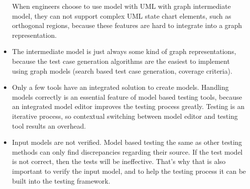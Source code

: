 \begin{itemize}
	When engineers choose to use model with UML with graph intermediate model, they can not support complex UML state chart elements, such as orthogonal regions, because these features are hard to integrate into a graph representation.
	\item The intermediate model is just always some kind of graph representations, because the test case generation algorithms are the easiest to implement using graph models (search based test case generation, coverage criteria).
	\item Only a few tools have an integrated solution to create models. Handling models correctly is an essential feature of model based testing tools, because an integrated model editor improves the testing process greatly. Testing is an iterative process, so contextual switching between model editor and testing tool results an overhead.
	\item Input models are not verified. Model based testing the same as other testing methods can only find discrepancies regarding their source. If the test model is not correct, then the tests will be ineffective. That's why that is also important to verify the input model, and to help the testing process it can be built into the testing framework.
\end{itemize}


